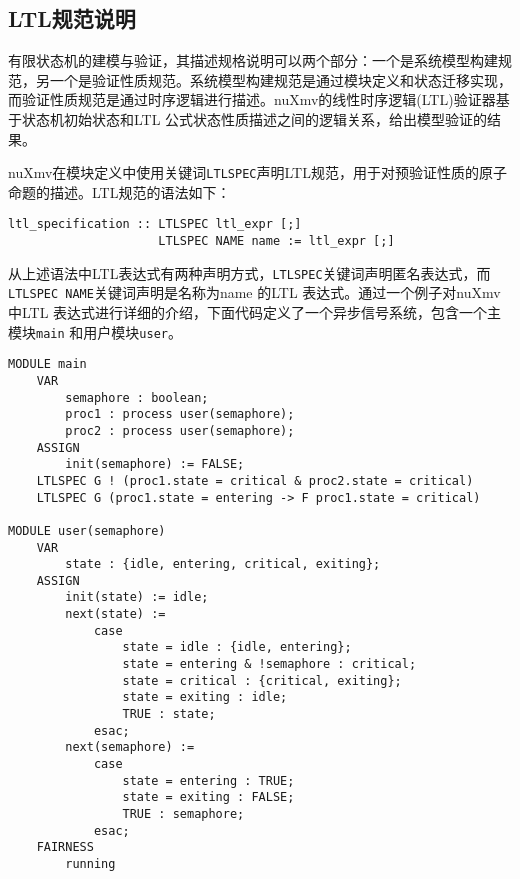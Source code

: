\subsection{LTL规范说明}
有限状态机的建模与验证，其描述规格说明可以两个部分：一个是系统模型构建规范，另一个是验证性质规范。系统模型构建规范是通过模块定义和状态迁移实现，而验证性质规范是通过时序逻辑进行描述。nuXmv的线性时序逻辑(LTL)验证器基于状态机初始状态和LTL 公式状态性质描述之间的逻辑关系，给出模型验证的结果。

nuXmv在模块定义中使用关键词\verb|LTLSPEC|声明LTL规范，用于对预验证性质的原子命题的描述。LTL规范的语法如下：

\begin{lstlisting}
ltl_specification :: LTLSPEC ltl_expr [;]
                     LTLSPEC NAME name := ltl_expr [;]
\end{lstlisting}

从上述语法中LTL表达式有两种声明方式，\verb|LTLSPEC|关键词声明匿名表达式，而\verb|LTLSPEC NAME|关键词声明是名称为name 的LTL 表达式。通过一个例子对nuXmv中LTL 表达式进行详细的介绍，下面代码定义了一个异步信号系统，包含一个主模块\verb|main| 和用户模块\verb|user|。

\begin{lstlisting}
MODULE main
    VAR
        semaphore : boolean;
        proc1 : process user(semaphore);
        proc2 : process user(semaphore);
    ASSIGN
        init(semaphore) := FALSE;
    LTLSPEC G ! (proc1.state = critical & proc2.state = critical)
    LTLSPEC G (proc1.state = entering -> F proc1.state = critical)

MODULE user(semaphore)
    VAR
        state : {idle, entering, critical, exiting};
    ASSIGN
        init(state) := idle;
        next(state) :=
            case
                state = idle : {idle, entering};
                state = entering & !semaphore : critical;
                state = critical : {critical, exiting};
                state = exiting : idle;
                TRUE : state;
            esac;
        next(semaphore) :=
            case
                state = entering : TRUE;
                state = exiting : FALSE;
                TRUE : semaphore;
            esac;
    FAIRNESS
        running
\end{lstlisting}


